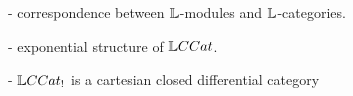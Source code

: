 
- correspondence between $\mathbb{L}$-modules and $\mathbb{L}$-categories.


- exponential structure of $\LCAT$.


- $\LCAT_{!}$ is a cartesian closed differential category

